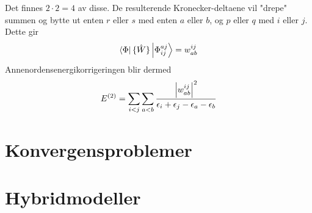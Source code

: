 \documentclass{beamer}
\begin{document}
\begin{frame}
	Det finnes $2\cdot2=4$ av disse. De resulterende Kronecker-deltaene vil "drepe" summen og bytte ut enten $r$ eller $s$ med enten $a$ eller $b$, og $p$ eller $q$ med $i$ eller $j$. Dette gir
	\begin{equation}
		\bra{\Phi} \{\hat W\}\ket{\Phi_{ij}^{aj}} = w_{ab}^{ij}
	\end{equation}
	Annenordensenergikorrigeringen blir dermed
	\begin{equation}
		E^{(2)} = \sum_{i<j}\sum_{a<b} \frac{\abs{w_{ab}^{ij}}^2}{\epsilon_i + \epsilon_j - \epsilon_a - \epsilon_b}
	\end{equation}
\end{frame}

\section{Konvergensproblemer}
\section{Hybridmodeller}
\end{document}
